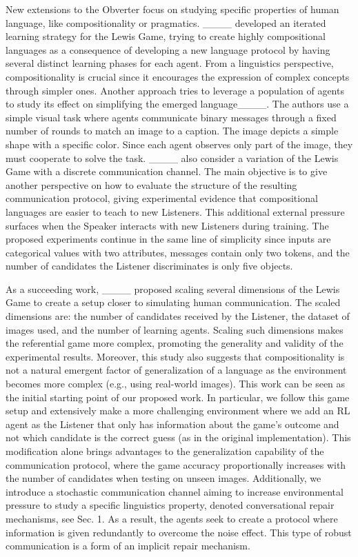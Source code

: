 New extensions to the Obverter focus on studying specific properties of human language, like compositionality or pragmatics. ____ developed an iterated learning strategy for the Lewis Game, trying to create highly compositional languages as a consequence of developing a new language protocol by having several distinct learning phases for each agent. From a linguistics perspective, compositionality is crucial since it encourages the expression of complex concepts through simpler ones. Another approach tries to leverage a population of agents to study its effect on simplifying the emerged language____. The authors use a simple visual task where agents communicate binary messages through a fixed number of rounds to match an image to a caption. The image depicts a simple shape with a specific color. Since each agent observes only part of the image, they must cooperate to solve the task. ____ also consider a variation of the Lewis Game with a discrete communication channel. The main objective is to give another perspective on how to evaluate the structure of the resulting communication protocol, giving experimental evidence that compositional languages are easier to teach to new Listeners. This additional external pressure surfaces when the Speaker interacts with new Listeners during training. The proposed experiments continue in the same line of simplicity since inputs are categorical values with two attributes, messages contain only two tokens, and the number of candidates the Listener discriminates is only five objects.

As a succeeding work, ____ proposed scaling several dimensions of the Lewis Game to create a setup closer to simulating human communication. The scaled dimensions are: the number of candidates received by the Listener, the dataset of images used, and the number of learning agents. Scaling such dimensions makes the referential game more complex, promoting the generality and validity of the experimental results. Moreover, this study also suggests that compositionality is not a natural emergent factor of generalization of a language as the environment becomes more complex (e.g., using real-world images). This work can be seen as the initial starting point of our proposed work. In particular, we follow this game setup and extensively make a more challenging environment where we add an RL agent as the Listener that only has information about the game's outcome and not which candidate is the correct guess (as in the original implementation). This modification alone brings advantages to the generalization capability of the communication protocol, where the game accuracy proportionally increases with the number of candidates when testing on unseen images. Additionally, we introduce a stochastic communication channel aiming to increase environmental pressure to study a specific linguistics property, denoted conversational repair mechanisms, see Sec. 1. As a result, the agents seek to create a protocol where information is given redundantly to overcome the noise effect. This type of robust communication is a form of an implicit repair mechanism.

